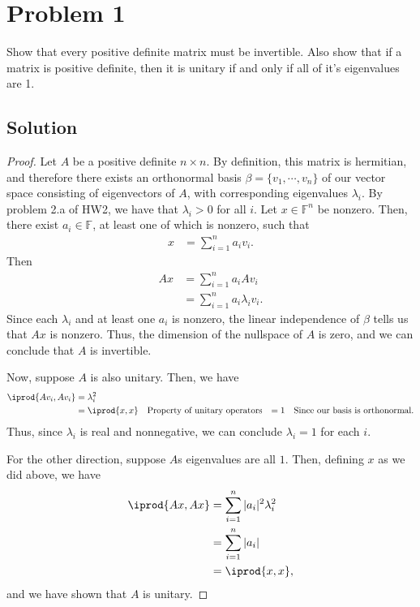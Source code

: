 \documentclass[10pt,a4paper]{article}
\author{Jeremiah Givens}
\theoremstyle{definition}
\begin{document}
\section*{Problem 1}
Show that every positive definite matrix must be invertible. Also show that if a matrix is positive definite, then it is unitary if and only if all of it's eigenvalues are 1.

\subsection*{Solution}
\begin{proof}
Let $A$ be a positive definite $n \times n$. By definition, this matrix is hermitian, and therefore there exists an orthonormal basis $\beta = \{v_1, \cdots, v_n\}$ of our vector space consisting of eigenvectors of $A$, with corresponding eigenvalues $\lambda_i$. By  problem 2.a of HW2, we have that $\lambda_i > 0$ for all $i$. Let $x \in \mathbb{F}^n$ be nonzero. Then, there exist $a_i \in \mathbb{F}$, at least one of which is nonzero, such that 
\begin{align*}
x &= \sum_{i=1}^n a_i v_i.
\end{align*}
Then
\begin{align*}
Ax &= \sum_{i=1}^n a_i Av_i\\
&= \sum_{i=1}^n a_i \lambda_i v_i.
\end{align*}
Since each $\lambda_i$ and at least one $a_i$ is nonzero, the linear independence of $\beta$ tells us that $Ax$ is nonzero. Thus, the dimension of the nullspace of $A$ is zero, and we can conclude that $A$ is invertible.

Now, suppose $A$ is also unitary. Then, we have 
\begin{align*}
\iprod{Av_i, Av_i} &= \lambda_i^2\\
&= \iprod{x,x} &&\text{Property of unitary operators}
&= 1 && \text{Since our basis is orthonormal}.
\end{align*}
Thus, since $\lambda_i$ is real and nonnegative, we can conclude $\lambda_i = 1$ for each $i$.

For the other direction, suppose $A$s eigenvalues are all $1$. Then, defining $x$ as we did above, we have
\begin{align*}
\iprod{Ax, Ax} &= \sum_{i=1}^n |a_i|^2 \lambda_i^2\\
&= \sum_{i=1}^n |a_i|\\
&= \iprod{x, x},
\end{align*}
and we have shown that $A$ is unitary.
\end{proof}
\end{document}
